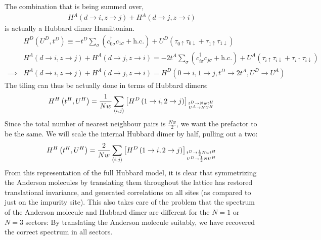 \documentclass[12pt]{article}
\numberwithin{equation}{section}
\begin{document}
The combination that is being summed over,
\begin{equation}\begin{aligned}
	H^A\left(d \to i, z \to j\right) + H^A\left(d \to j, z \to i\right)
\end{aligned}\end{equation}
is actually a Hubbard dimer Hamiltonian.
\begin{equation}\begin{aligned}
	&H^D(U^D, t^D) \equiv -t^D\sum_\sigma\left( c^\dagger_{0\sigma}c_{1\sigma} + \text{h.c.} \right) + U^D\left( \tau_{0 \uparrow}\tau_{0 \downarrow} + \tau_{1 \uparrow}\tau_{1 \downarrow}\right)\\
	&H^A\left(d \to i, z \to j\right) + H^A\left(d \to j, z \to i\right) = -2t^A\sum_\sigma\left( c^\dagger_{i\sigma}c_{j\sigma} + \text{h.c.} \right) + U^A\left( \tau_{i \uparrow}\tau_{i \downarrow} + \tau_{i \uparrow}\tau_{i \downarrow}\right)\\
	\implies &H^A\left(d \to i, z \to j\right) + H^A\left(d \to j, z \to i\right) = H^D(0 \to i, 1 \to j, t^D \to 2t^A, U^D \to U^A)
\end{aligned}\end{equation}
The tiling can thus be actually done in terms of Hubbard dimers:
\begin{equation}\begin{aligned}
	H^H\left(t^H, U^H\right)  = \frac{1}{Nw}\sum_{\left<i,j\right>}\left[H^D\left(1 \to i, 2 \to j\right)\right]_{t^D \to Nwt^H \atop{U^A \to N U^H}}
\end{aligned}\end{equation}
Since the total number of nearest neighbour pairs is $\frac{Nw}{2}$, we want the prefactor to be the same. We will scale the internal Hubbard dimer by half, pulling out a two:
\begin{equation}\begin{aligned}
	\label{H_tiled}
	H^H\left(t^H, U^H\right)  = \frac{2}{Nw}\sum_{\left<i,j\right>}\left[H^D\left(1 \to i, 2 \to j\right)\right]_{t^D \to \frac{1}{2}Nwt^H \atop{U^D \to \frac{1}{2}N U^H}}
\end{aligned}\end{equation}
From this representation of the full Hubbard model, it is clear that symmetrizing the Anderson molecules by translating them throughout the lattice has restored translational invariance, and generated correlations on all sites (as compared to just on the impurity site). This also takes care of the problem that the spectrum of the Anderson molecule and Hubbard dimer are different for the $N=1$ or $N=3$ sectors: By translating the Anderson molecule suitably, we have recovered the correct spectrum in all sectors.
\end{document}
